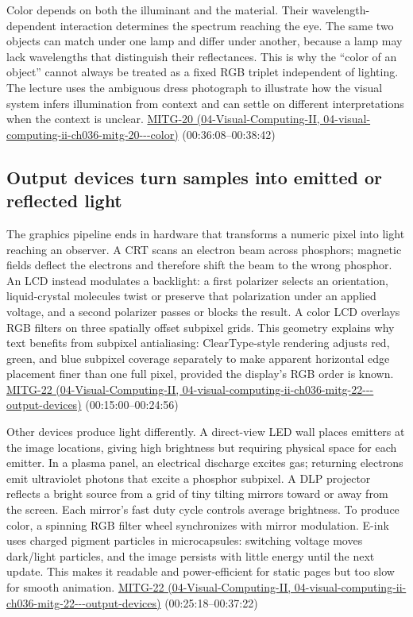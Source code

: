 Color depends on both the illuminant and the material. Their wavelength-dependent interaction determines the spectrum reaching the eye. The same two objects can match under one lamp and differ under another, because a lamp may lack wavelengths that distinguish their reflectances. This is why the ``color of an object'' cannot always be treated as a fixed RGB triplet independent of lighting. The lecture uses the ambiguous dress photograph to illustrate how the visual system infers illumination from context and can settle on different interpretations when the context is unclear. \href{../04-Visual-Computing-II/main.pdf\#nameddest=04-visual-computing-ii-ch036-mitg-20---color}{MITG-20 (04-Visual-Computing-II, 04-visual-computing-ii-ch036-mitg-20-\/-\/-color)} (00:36:08--00:38:42)

\subsection{Output devices turn samples into emitted or reflected light}\label{03-visual-computing-i-ch004-output-devices-turn-samples-into-emitted-or-reflected-light}

The graphics pipeline ends in hardware that transforms a numeric pixel into light reaching an observer. A CRT scans an electron beam across phosphors; magnetic fields deflect the electrons and therefore shift the beam to the wrong phosphor. An LCD instead modulates a backlight: a first polarizer selects an orientation, liquid-crystal molecules twist or preserve that polarization under an applied voltage, and a second polarizer passes or blocks the result. A color LCD overlays RGB filters on three spatially offset subpixel grids. This geometry explains why text benefits from subpixel antialiasing: ClearType-style rendering adjusts red, green, and blue subpixel coverage separately to make apparent horizontal edge placement finer than one full pixel, provided the display's RGB order is known. \href{../04-Visual-Computing-II/main.pdf\#nameddest=04-visual-computing-ii-ch036-mitg-22---output-devices}{MITG-22 (04-Visual-Computing-II, 04-visual-computing-ii-ch036-mitg-22-\/-\/-output-devices)} (00:15:00--00:24:56)

Other devices produce light differently. A direct-view LED wall places emitters at the image locations, giving high brightness but requiring physical space for each emitter. In a plasma panel, an electrical discharge excites gas; returning electrons emit ultraviolet photons that excite a phosphor subpixel. A DLP projector reflects a bright source from a grid of tiny tilting mirrors toward or away from the screen. Each mirror's fast duty cycle controls average brightness. To produce color, a spinning RGB filter wheel synchronizes with mirror modulation. E-ink uses charged pigment particles in microcapsules: switching voltage moves dark/light particles, and the image persists with little energy until the next update. This makes it readable and power-efficient for static pages but too slow for smooth animation. \href{../04-Visual-Computing-II/main.pdf\#nameddest=04-visual-computing-ii-ch036-mitg-22---output-devices}{MITG-22 (04-Visual-Computing-II, 04-visual-computing-ii-ch036-mitg-22-\/-\/-output-devices)} (00:25:18--00:37:22)

